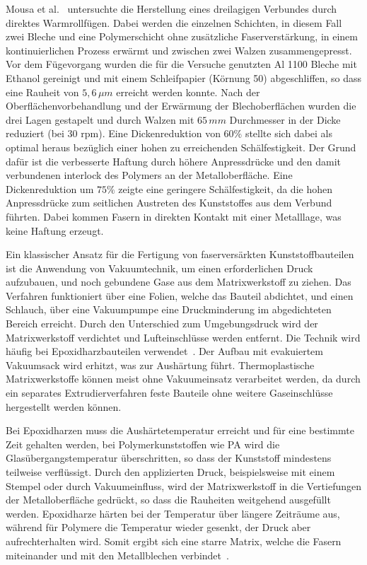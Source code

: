 Mousa et al.~\cite{Mousa2017} untersuchte die Herstellung eines dreilagigen Verbundes durch direktes Warmrollfügen.
Dabei werden die einzelnen Schichten, in diesem Fall zwei Bleche und eine Polymerschicht ohne zusätzliche Faserverstärkung, in einem kontinuierlichen Prozess erwärmt und zwischen zwei Walzen zusammengepresst.
Vor dem Fügevorgang wurden die für die Versuche genutzten Al 1100 Bleche mit Ethanol gereinigt und mit einem Schleifpapier (Körnung 50) abgeschliffen, so dass eine Rauheit von $5,6\, \mu m$ erreicht werden konnte.
Nach der Oberflächenvorbehandlung und der Erwärmung der Blechoberflächen wurden die drei Lagen gestapelt und durch Walzen mit $65\, mm$ Durchmesser in der Dicke reduziert (bei 30 rpm).
Eine Dickenreduktion von $60 \%$ stellte sich dabei als optimal heraus bezüglich einer hohen zu erreichenden Schälfestigkeit.
Der Grund dafür ist die verbesserte Haftung durch höhere Anpressdrücke und den damit verbundenen interlock des Polymers an der Metalloberfläche.
Eine Dickenreduktion um $75\%$ zeigte eine geringere Schälfestigkeit, da die hohen Anpressdrücke zum seitlichen Austreten des Kunststoffes aus dem Verbund führten.
Dabei kommen Fasern in direkten Kontakt mit einer Metalllage, was keine Haftung erzeugt.

Ein klassischer Ansatz für die Fertigung von faserversärkten Kunststoffbauteilen ist die Anwendung von Vakuumtechnik, um einen erforderlichen Druck aufzubauen, und noch gebundene Gase aus dem Matrixwerkstoff zu ziehen.
Das Verfahren funktioniert über eine Folien, welche das Bauteil abdichtet, und einen Schlauch, über eine Vakuumpumpe eine Druckminderung im abgedichteten Bereich erreicht.
Durch den Unterschied zum Umgebungsdruck wird der Matrixwerkstoff verdichtet und Lufteinschlüsse werden entfernt.
Die Technik wird häufig bei Epoxidharzbauteilen verwendet~\cite{Bellini2020}.
Der Aufbau mit evakuiertem Vakuumsack wird erhitzt, was zur Aushärtung führt.
Thermoplastische Matrixwerkstoffe können meist ohne Vakuumeinsatz verarbeitet werden, da durch ein separates Extrudierverfahren feste Bauteile ohne weitere Gaseinschlüsse hergestellt werden können.

Bei Epoxidharzen muss die Aushärtetemperatur erreicht und für eine bestimmte Zeit gehalten werden, bei Polymerkunststoffen wie PA wird die Glasübergangstemperatur überschritten, so dass der Kunststoff mindestens teilweise verflüssigt.
Durch den applizierten Druck, beispielsweise mit einem Stempel oder durch Vakuumeinfluss, wird der Matrixwerkstoff in die Vertiefungen der Metalloberfläche gedrückt, so dass die Rauheiten weitgehend ausgefüllt werden.
Epoxidharze härten bei der Temperatur über längere Zeiträume aus, während für Polymere die Temperatur wieder gesenkt, der Druck aber aufrechterhalten wird.
Somit ergibt sich eine starre Matrix, welche die Fasern miteinander und mit den Metallblechen verbindet~\cite{Sinmazcelik2011}.

